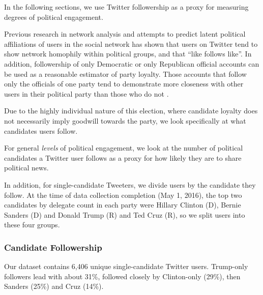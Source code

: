 \documentclass[letterpaper]{article}
\begin{document}
In the following sections, we use Twitter followership as a proxy for measuring degrees of political engagement. 

Previous research in network analysis and attempts to predict latent political affiliations of users in the social network has shown that users on Twitter tend to show network homophily within political groups, and that ``like follows like''. In addition, followership of only Democratic or only Republican official accounts can be used as a reasonable estimator of party loyalty. Those accounts that follow only the officials of one party tend to demonstrate more closeness with other users in their political party than those who do not \cite{colleoni2014echo}.
            
Due to the highly individual nature of this election, where candidate loyalty does not necessarily imply goodwill towards the party, we look specifically at what candidates users follow. 

For general \emph{levels} of political engagement, we look at the number of political candidates a Twitter user follows as a proxy for how likely they are to share political news. 

In addition, for single-candidate Tweeters, we divide users by the candidate they follow. At the time of data collection completion (May 1, 2016), the top two candidates by delegate count in each party were Hillary Clinton (D), Bernie Sanders (D) and Donald Trump (R) and Ted Cruz (R), so we split users into these four groups. 


\subsubsection{Candidate Followership}

Our dataset contains 6,406 unique single-candidate Twitter users. Trump-only followers lead with about 31\%, followed closely by Clinton-only (29\%), then Sanders (25\%) and Cruz (14\%).
\end{document}
